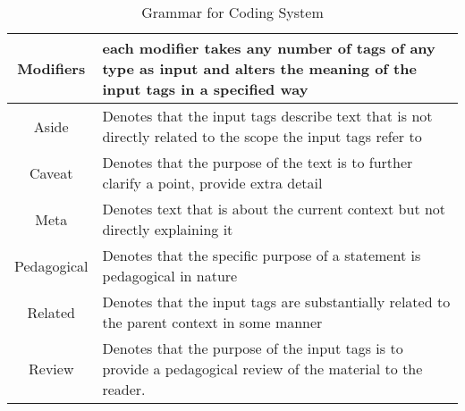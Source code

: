 \begin{table}[h!]
\begin{tabular}{c p{1.8\linewidth}}
    Modifiers & each modifier takes any number of tags of any type as input and alters the meaning of the input tags in a specified way \\
    \hline
    Aside & Denotes that the input tags describe text that is not directly related to the scope the input tags refer to \\
    Caveat & Denotes that the purpose of the text is to further clarify a point, provide extra detail\\
    Meta & Denotes text that is about the current context but not directly explaining it\\
    Pedagogical & Denotes that the specific purpose of a statement is pedagogical in nature\\
    Related & Denotes that the input tags are substantially related to the parent context in some manner\\
    Review & Denotes that the purpose of the input tags is to provide a pedagogical review of the material to the reader.\\
  \end{tabular}
  \caption{Grammar for Coding System}
  \label{res:tbl:grmr}
\end{table}
